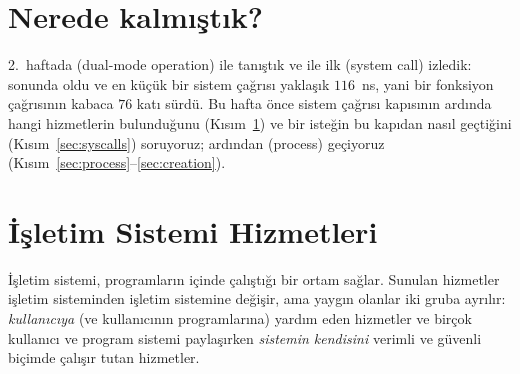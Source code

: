 \setcounter{tocdepth}{1}
\tableofcontents

\section*{Nerede kalmıştık?}
2.~haftada  (dual-mode operation) ile tanıştık ve  ile ilk  (system call) izledik:  sonunda  oldu ve en küçük bir sistem çağrısı yaklaşık $116$~ns, yani bir fonksiyon çağrısının kabaca $76$ katı sürdü. Bu hafta önce sistem çağrısı kapısının ardında hangi hizmetlerin bulunduğunu (Kısım~\ref{sec:services}) ve bir isteğin bu kapıdan nasıl geçtiğini (Kısım~\ref{sec:syscalls}) soruyoruz; ardından  (process) geçiyoruz (Kısım~\ref{sec:process}--\ref{sec:creation}).

\section{İşletim Sistemi Hizmetleri}
\label{sec:services}

İşletim sistemi, programların içinde çalıştığı bir ortam sağlar. Sunulan hizmetler işletim sisteminden işletim sistemine değişir, ama yaygın olanlar iki gruba ayrılır: \emph{kullanıcıya} (ve kullanıcının programlarına) yardım eden hizmetler ve birçok kullanıcı ve program sistemi paylaşırken \emph{sistemin kendisini} verimli ve güvenli biçimde çalışır tutan hizmetler.

